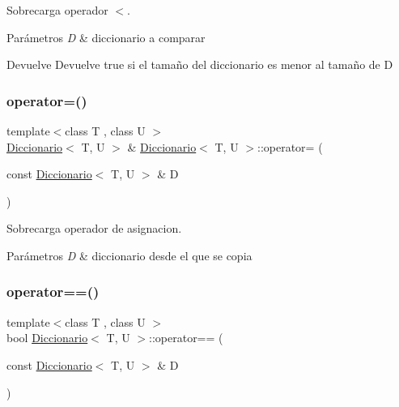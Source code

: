 Sobrecarga operador $<$. 


\begin{DoxyParams}{Parámetros}
{\em D} & diccionario a comparar \\
\hline
\end{DoxyParams}
\begin{DoxyReturn}{Devuelve}
Devuelve true si el tamaño del diccionario es menor al tamaño de D 
\end{DoxyReturn}
\mbox{\label{classDiccionario_ad30f63b3857757296f1302273ee50a3d}} 
\subsubsection{\texorpdfstring{operator=()}{operator=()}}
{\footnotesize\ttfamily template$<$class T , class U $>$ \\
\hyperlink{classDiccionario}{Diccionario}$<$ T, U $>$ \& \hyperlink{classDiccionario}{Diccionario}$<$ T, U $>$\+::operator= (\begin{DoxyParamCaption}\item[{const \hyperlink{classDiccionario}{Diccionario}$<$ T, U $>$ \&}]{D }\end{DoxyParamCaption})}



Sobrecarga operador de asignacion. 


\begin{DoxyParams}{Parámetros}
{\em D} & diccionario desde el que se copia \\
\hline
\end{DoxyParams}
\mbox{\label{classDiccionario_a7470b316f0ea3f44b41079d8c625f65e}} 
\subsubsection{\texorpdfstring{operator==()}{operator==()}}
{\footnotesize\ttfamily template$<$class T , class U $>$ \\
bool \hyperlink{classDiccionario}{Diccionario}$<$ T, U $>$\+::operator== (\begin{DoxyParamCaption}\item[{const \hyperlink{classDiccionario}{Diccionario}$<$ T, U $>$ \&}]{D }\end{DoxyParamCaption})}




